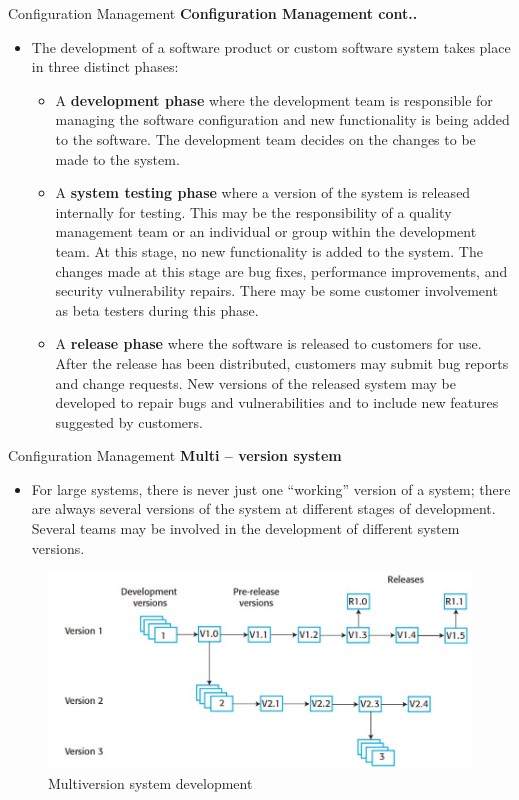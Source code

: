 \documentclass{beamer}
\begin{document}
\begin{frame}{Configuration Management}
\textbf{Configuration Management cont..}
\begin{itemize}
	\item The development of a software product or custom software system takes place in three distinct phases:
	\begin{itemize}
		\item  A\textbf{ development phase} where the development team is responsible for managing the software 
		configuration and new functionality is being added to the software. The development team decides on 
		the changes to be made to the system.
		\item A \textbf{system testing phase }where a version of the system is released internally for testing. This may be the 
		responsibility of a quality management team or an individual or group within the development team. 
		At this stage, no new functionality is added to the system. The changes made at this stage are bug fixes, 
		performance improvements, and security vulnerability repairs. There may be some customer 
		involvement as beta testers during this phase.
		\item A \textbf{release phase} where the software is released to customers for use. After the release has been 
		distributed, customers may submit bug reports and change requests. New versions of the released 
		system may be developed to repair bugs and vulnerabilities and to include new features suggested by 
		customers.
	\end{itemize}
\end{itemize}
\end{frame}
\begin{frame}{Configuration Management}
\textbf{Multi – version system}
\begin{itemize}
	\item For large systems, there is never just one “working” version of a system; there are always several versions 
	of the system at different stages of development. Several teams may be involved in the development of 
	different system versions.
\end{itemize}

	\begin{figure}
	\includegraphics[scale=.5]{img/m4_10}
	\caption{Multiversion system 
		development}
\end{figure}
\end{frame}
\end{document}
